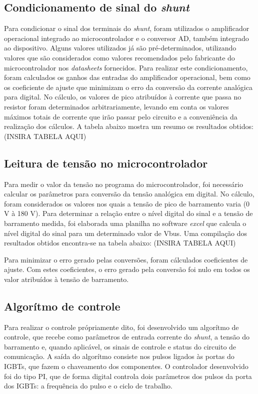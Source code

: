 \subsection{Condicionamento de sinal do \textit{shunt}}
Para condicionar o sinal dos terminais do \textit{shunt}, foram utilizados o amplificador operacional integrado ao microcontrolador e o conversor AD, também integrado ao dispositivo. Alguns valores utilizados já são pré-determinados, utilizando valores que são considerados como valores recomendados pelo fabricante do microcontrolador nos \textit{datasheets} fornecidos. Para realizar este condicionamento, foram calculados os ganhos das entradas do amplificador operacional, bem como os coeficiente de ajuste que minimizam o erro da conversão da corrente analógica para digital. No cálculo, os valores de pico atribuídos à corrente que passa no resistor foram determinados arbitrariamente, levando em conta os valores máximos totais de corrente que irão passar pelo circuito e a conveniência da realização dos cálculos. A tabela abaixo mostra um resumo os resultados obtidos:
(INSIRA TABELA AQUI)

\subsection{Leitura de tensão no microcontrolador}
Para medir o valor da tensão no programa do microcontrolador, foi necessário calcular os parâmetros para conversão da tensão analógica em digital. No cálculo, foram considerados os valores nos quais a tensão de pico de barramento varia (0 V à 180 V). Para determinar a relação entre o nível digital do sinal e a tensão de barramento medida, foi elaborada uma planilha no software \textit{excel} que calcula o nível digital do sinal para um determinado valor de Vbus. Uma compilação dos resultados obtidos encontra-se na tabela abaixo:
(INSIRA TABELA AQUI)

Para minimizar o erro gerado pelas conversões, foram cálculados coeficientes de ajuste. Com estes coeficientes, o erro gerado pela conversão foi nulo em todos os valor atribuídos à tensão de barramento.

\subsection{Algorítmo de controle}
Para realizar o controle própriamente dito, foi desenvolvido um algorítmo de controle, que recebe como parâmetros de entrada corrente do \textit{shunt}, a tensão do barramento e, quando aplicável, os sinais de controle e status do circuito de comunicação. A saída do algorítmo consiste nos pulsos ligados às portas do IGBTs, que fazem o chaveamento dos componentes. O controlador desenvolvido foi do tipo PI, que de forma digital controla dois parâmetros dos pulsos da porta dos IGBTs: a frequência do pulso e o ciclo de trabalho.

